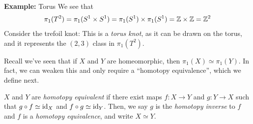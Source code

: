 \begin{example}{\textbf{Example:} Torus}
    We see that
    \[ \pi_1(T^2) = \pi_1(S^1 \times S^1) = \pi_1(S^1) \times \pi_1(S^1) = \mathbb{Z} \times \mathbb{Z} = \mathbb{Z}^2 \]
    Consider the trefoil knot:
    This is a \emph{torus knot}, as it can be drawn on the torus, and it represents the $(2, 3)$ class in $\pi_1(T^2)$.
\end{example}

Recall we've seen that if $X$ and $Y$ are homeomorphic, then $\pi_1(X) \simeq \pi_1(Y)$. In fact, we can weaken this and only require a ``homotopy equivalence'', which we define next.

\begin{definition}
    $X$ and $Y$ are \emph{homotopy equivalent} if there exist maps $f : X \to Y$ and $g : Y \to X$ such that $g \circ f \simeq \text{id}_X$ and $f \circ g \simeq \text{id}_Y$. Then, we say $g$ is the \emph{homotopy inverse} to $f$ and $f$ is a \emph{homotopy equivalence}, and write $X \simeq Y$.
\end{definition}


